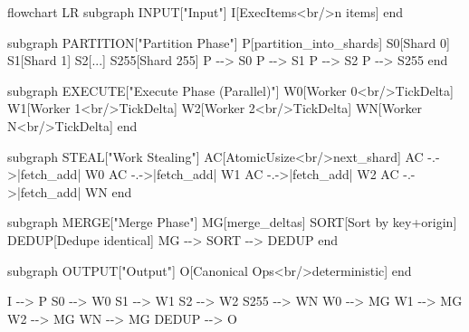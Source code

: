 \documentclass[
]{book}
\newenvironment{Shaded}{}{}
\newcommand{\NormalTok}[1]{#1}
\begin{document}
\begin{Shaded}
\begin{Highlighting}[]
\NormalTok{flowchart LR}
\NormalTok{    subgraph INPUT["Input"]}
\NormalTok{        I[ExecItems\textless{}br/\textgreater{}n items]}
\NormalTok{    end}

\NormalTok{    subgraph PARTITION["Partition Phase"]}
\NormalTok{        P[partition\_into\_shards]}
\NormalTok{        S0[Shard 0]}
\NormalTok{        S1[Shard 1]}
\NormalTok{        S2[...]}
\NormalTok{        S255[Shard 255]}
\NormalTok{        P {-}{-}\textgreater{} S0}
\NormalTok{        P {-}{-}\textgreater{} S1}
\NormalTok{        P {-}{-}\textgreater{} S2}
\NormalTok{        P {-}{-}\textgreater{} S255}
\NormalTok{    end}

\NormalTok{    subgraph EXECUTE["Execute Phase (Parallel)"]}
\NormalTok{        W0[Worker 0\textless{}br/\textgreater{}TickDelta]}
\NormalTok{        W1[Worker 1\textless{}br/\textgreater{}TickDelta]}
\NormalTok{        W2[Worker 2\textless{}br/\textgreater{}TickDelta]}
\NormalTok{        WN[Worker N\textless{}br/\textgreater{}TickDelta]}
\NormalTok{    end}

\NormalTok{    subgraph STEAL["Work Stealing"]}
\NormalTok{        AC[AtomicUsize\textless{}br/\textgreater{}next\_shard]}
\NormalTok{        AC {-}.{-}\textgreater{}|fetch\_add| W0}
\NormalTok{        AC {-}.{-}\textgreater{}|fetch\_add| W1}
\NormalTok{        AC {-}.{-}\textgreater{}|fetch\_add| W2}
\NormalTok{        AC {-}.{-}\textgreater{}|fetch\_add| WN}
\NormalTok{    end}

\NormalTok{    subgraph MERGE["Merge Phase"]}
\NormalTok{        MG[merge\_deltas]}
\NormalTok{        SORT[Sort by key+origin]}
\NormalTok{        DEDUP[Dedupe identical]}
\NormalTok{        MG {-}{-}\textgreater{} SORT {-}{-}\textgreater{} DEDUP}
\NormalTok{    end}

\NormalTok{    subgraph OUTPUT["Output"]}
\NormalTok{        O[Canonical Ops\textless{}br/\textgreater{}deterministic]}
\NormalTok{    end}

\NormalTok{    I {-}{-}\textgreater{} P}
\NormalTok{    S0 {-}{-}\textgreater{} W0}
\NormalTok{    S1 {-}{-}\textgreater{} W1}
\NormalTok{    S2 {-}{-}\textgreater{} W2}
\NormalTok{    S255 {-}{-}\textgreater{} WN}
\NormalTok{    W0 {-}{-}\textgreater{} MG}
\NormalTok{    W1 {-}{-}\textgreater{} MG}
\NormalTok{    W2 {-}{-}\textgreater{} MG}
\NormalTok{    WN {-}{-}\textgreater{} MG}
\NormalTok{    DEDUP {-}{-}\textgreater{} O}
\end{Highlighting}
\end{Shaded}
\end{document}
